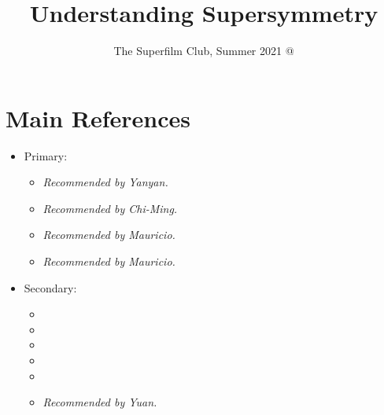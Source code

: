 \documentclass[a4paper
	,10pt
]{article}
\title{Understanding Supersymmetry}
\author{The Superfilm Club, Summer 2021 @ \textkai{近春园}}
\begin{document}
\maketitle
{}
\thispagestyle{empty}


\setlength{\parskip}{.1\baselineskip}
\tableofcontents
\setlength{\parskip}{\parskipnorm}

\addtocounter{section}{-1}
\section{Main References}
\raggedright
\begin{itemize}
\item Primary:
	\begin{itemize}[itemsep=\parskip]%
	\item[\cite{Argyres:1996abc}]
		\par \textit{Recommended by Yanyan.}
		
	\item[\cite{Tachikawa:2018sae}]
		\par \textit{Recommended by Chi-Ming.}
		
	\item[\cite{Figueroa-OFarrill:2001xbd}]
		\par \textit{Recommended by Mauricio.}
		
	\item[\cite{VanProeyen:1999ni}]
		\par \textit{Recommended by Mauricio.}
		
	\end{itemize}
\item Secondary:
	\begin{itemize}
	\item[\cite{Freedman:2012zz}]
	
	\item[\cite{Wess:1992cp}]
	
	\item[\cite{Hori:2003ic}]
	
	\item[\cite{figueroa2015majorana}]
	
	\item[\cite{Zhou:2018abc}]
	
	\item[\cite{Kapranov:2015nft}]
		\par \textit{Recommended by Yuan.}
		
	\end{itemize}
\end{itemize}
\justifying
\end{document}
